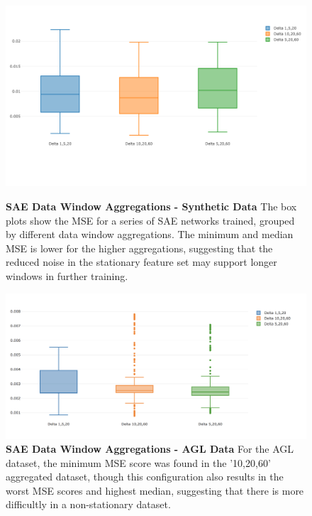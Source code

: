 \documentclass[a4paper,11pt,oneside]{article}
\theoremstyle{plain}
\theoremstyle{definition}
\begin{document}
\begin{figure}[H]
	\centering
	\begin{minipage}{0.45\textwidth}
		\centering 
		\includegraphics[scale=0.3]{images/iteration_four/it4_sae_deltas.png}
		\caption{\textbf{SAE Data Window Aggregations - Synthetic Data} 
			\newline The box plots show the MSE for a series of SAE networks trained, grouped by different data window aggregations. The minimum and median MSE is lower for the higher aggregations, suggesting that the reduced noise in the stationary feature set may support longer windows in further training.}
		\label{figure-results_sae_deltas}
	\end{minipage}\hfill
	\begin{minipage}{0.45\textwidth}
		\centering \includegraphics[scale=0.3]{images/iteration_five/it5_delta_sae.png}
		\caption{\textbf{SAE Data Window Aggregations - AGL Data} 
			\newline For the AGL dataset, the minimum MSE score was found in the '10,20,60' aggregated dataset, though this configuration also results in the worst MSE scores and highest median, suggesting that there is more difficultly in a non-stationary dataset.}
		\label{figure-it5_delta_sae}
	\end{minipage}
\end{figure}
\end{document}
